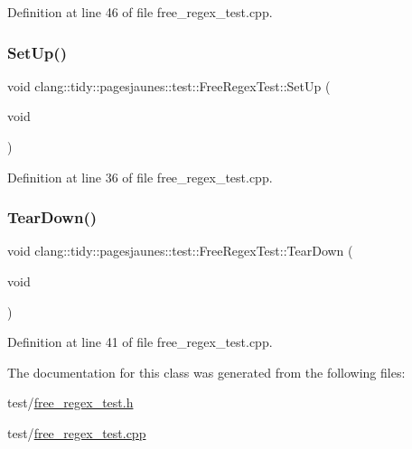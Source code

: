 Definition at line 46 of file free\+\_\+regex\+\_\+test.\+cpp.

\mbox{\label{classclang_1_1tidy_1_1pagesjaunes_1_1test_1_1_free_regex_test_a890d2e277f032aa2b39ae842f3724f61}} 
\subsubsection{\texorpdfstring{Set\+Up()}{SetUp()}}
{\footnotesize\ttfamily void clang\+::tidy\+::pagesjaunes\+::test\+::\+Free\+Regex\+Test\+::\+Set\+Up (\begin{DoxyParamCaption}\item[{void}]{ }\end{DoxyParamCaption})\hspace{0.3cm}{\ttfamily [virtual]}}



Definition at line 36 of file free\+\_\+regex\+\_\+test.\+cpp.

\mbox{\label{classclang_1_1tidy_1_1pagesjaunes_1_1test_1_1_free_regex_test_a2d14369ffac4dca3369702fa4ab95434}} 
\subsubsection{\texorpdfstring{Tear\+Down()}{TearDown()}}
{\footnotesize\ttfamily void clang\+::tidy\+::pagesjaunes\+::test\+::\+Free\+Regex\+Test\+::\+Tear\+Down (\begin{DoxyParamCaption}\item[{void}]{ }\end{DoxyParamCaption})\hspace{0.3cm}{\ttfamily [virtual]}}



Definition at line 41 of file free\+\_\+regex\+\_\+test.\+cpp.



The documentation for this class was generated from the following files\+:\begin{DoxyCompactItemize}
\item 
test/\hyperlink{free__regex__test_8h}{free\+\_\+regex\+\_\+test.\+h}\item 
test/\hyperlink{free__regex__test_8cpp}{free\+\_\+regex\+\_\+test.\+cpp}\end{DoxyCompactItemize}
